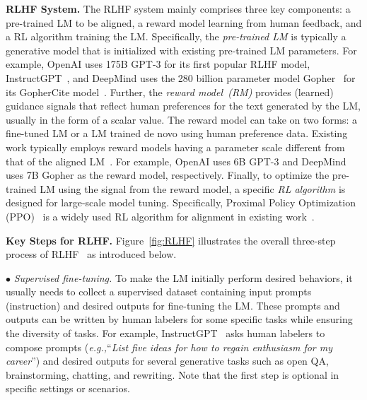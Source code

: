 \textbf{RLHF System.} The RLHF system mainly comprises three key components: a pre-trained LM to be aligned, a reward model learning from human feedback, and a RL algorithm training the LM. Specifically, the \textit{pre-trained LM} is typically a generative model that is  initialized with existing pre-trained LM parameters. For example, OpenAI uses 175B GPT-3 for its first popular RLHF model, InstructGPT~\cite{Ouyang-arxiv-2022-Training}, and DeepMind uses the 280 billion parameter model Gopher~\cite{Rae-arxiv-2021-Scaling} for {its GopherCite model~\cite{Menick-arxiv-2022-teaching}. } Further, the \textit{reward model~(RM)} provides (learned) guidance signals that reflect human preferences for the text generated by the LM, usually in the form of a scalar value. The reward model can take on two forms: a fine-tuned LM or a LM trained de novo using human preference data. {Existing work typically employs reward models having  a  parameter scale different from that of the aligned LM~\cite{Menick-arxiv-2022-teaching,Ouyang-arxiv-2022-Training}.} For example, OpenAI uses 6B GPT-3 and DeepMind uses 7B Gopher as the reward model, respectively. Finally, to optimize the pre-trained LM using the signal from the reward model, a specific \textit{RL algorithm} is designed for large-scale model tuning. Specifically, Proximal Policy Optimization (PPO)~\cite{schulman-arxiv-2017-proximal} is a widely used RL algorithm for alignment in existing work~\cite{Ouyang-arxiv-2022-Training,Menick-arxiv-2022-teaching,Glaese-arxiv-2022-Improving}. 

\textbf{Key Steps for RLHF.} Figure~\ref{fig:RLHF} illustrates the overall three-step process of RLHF~\cite{Ouyang-arxiv-2022-Training} as introduced below. 

$\bullet$ \textit{Supervised fine-tuning.} To make the LM initially perform desired behaviors, it  usually needs to collect a supervised dataset containing input prompts (instruction) and desired outputs for fine-tuning the LM. These prompts and outputs can be written by human labelers for some specific  tasks while ensuring the diversity of tasks. {For example, InstructGPT~\cite{Ouyang-arxiv-2022-Training} asks human labelers to compose prompts (\emph{e.g.,}``\emph{List five ideas for how to regain enthusiasm for my career}'') and desired outputs for several generative tasks such as open QA, brainstorming, chatting, and rewriting. } Note that the first step is optional in specific settings or scenarios. 

